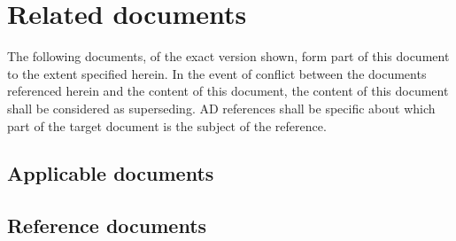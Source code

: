 \section{Related documents}

The following documents, of the exact version shown, form part of this document to the extent specified herein. In the event of conflict between the documents referenced herein and the content of this document, the content of this document shall be considered as superseding.  AD references shall be specific about which part of the target document is the subject of the reference.

\subsection{Applicable documents}
\begin{ADlist}
\end{ADlist}


\subsection{Reference documents}
\begin{RDlist}
\end{RDlist}

